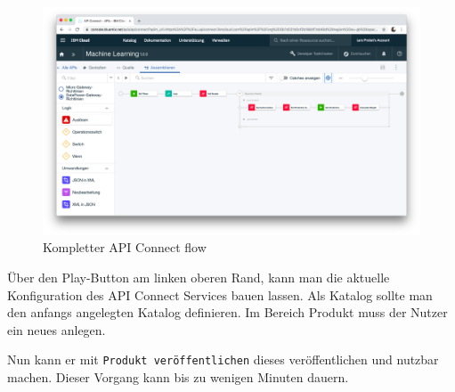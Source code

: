 \begin{figure}[h]
    \centering
    \includegraphics[scale=0.26]{images/kapitel_3/api_connect.png}
    \caption{Kompletter API Connect flow}
    \label{fig:umsetzung_api_connect}
\end{figure}

Über den Play-Button am linken oberen Rand, kann man die aktuelle Konfiguration des API Connect Services bauen lassen.
Als Katalog sollte man den anfangs angelegten Katalog definieren. Im Bereich Produkt muss der Nutzer ein neues anlegen.

Nun kann er mit \texttt{Produkt veröffentlichen} dieses veröffentlichen und nutzbar machen. Dieser Vorgang kann bis zu
wenigen Minuten dauern.